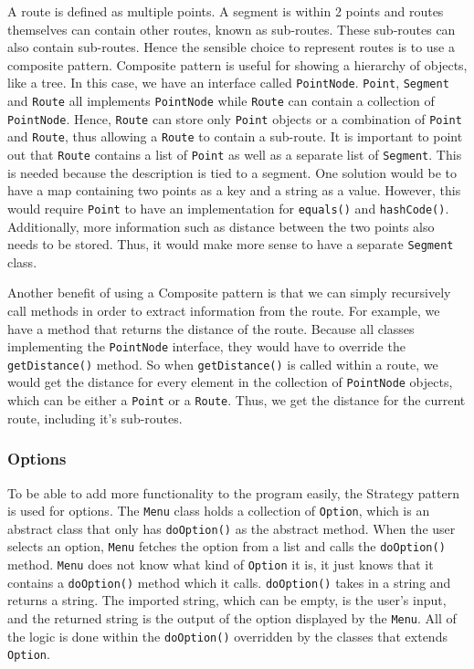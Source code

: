 \documentclass[a4paper, 12pt, titlepage]{article}
\newcommand{\code}[1]{\small\texttt{#1}\normalsize}
\begin{document}
A route is defined as multiple points. A segment is within 2 points and routes
themselves can contain other routes, known as sub-routes. These sub-routes can
also contain sub-routes. Hence the sensible choice to represent routes is to
use a composite pattern. Composite pattern is useful for showing a hierarchy of
objects, like a tree. In this case, we have an interface called
\code{PointNode}. \code{Point}, \code{Segment} and \code{Route} all implements
\code{PointNode} while \code{Route} can contain a collection of
\code{PointNode}. Hence, \code{Route} can store only \code{Point} objects or a
combination of \code{Point} and \code{Route}, thus allowing a \code{Route} to
contain a sub-route. It is important to point out that \code{Route} contains a
list of \code{Point} as well as a separate list of \code{Segment}. This is
needed because the description is tied to a segment. One solution would be to
have a map containing two points as a key and a string as a value. However,
this would require \code{Point} to have an implementation for \code{equals()}
and \code{hashCode()}. Additionally, more information such as distance between
the two points also needs to be stored. Thus, it would make more sense to have
a separate \code{Segment} class.

Another benefit of using a Composite pattern is that we can simply recursively
call methods in order to extract information from the route. For example, we
have a method that returns the distance of the route. Because all classes
implementing the \code{PointNode} interface, they would have to override the
\code{getDistance()} method. So when \code{getDistance()} is called within a
route, we would get the distance for every element in the collection of
\code{PointNode} objects, which can be either a \code{Point} or a \code{Route}.
Thus, we get the distance for the current route, including it's sub-routes.


\subsubsection{Options}

To be able to add more functionality to the program easily, the Strategy
pattern is used for options. The \code{Menu} class holds a collection of
\code{Option}, which is an abstract class that only has \code{doOption()} as
the abstract method. When the user selects an option, \code{Menu} fetches the
option from a list and calls the \code{doOption()} method. \code{Menu} does not
know what kind of \code{Option} it is, it just knows that it contains a
\code{doOption()} method which it calls. \code{doOption()} takes in a string
and returns a string. The imported string, which can be empty, is the user's
input, and the returned string is the output of the option displayed by the
\code{Menu}. All of the logic is done within the \code{doOption()} overridden
by the classes that extends \code{Option}.
\end{document}
